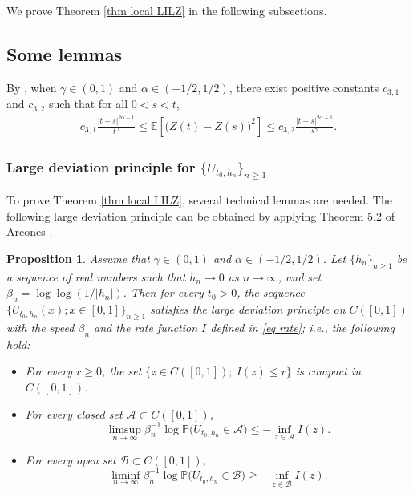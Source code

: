 \documentclass[11pt, reqno]{amsart}
\numberwithin{equation}{section}
\newtheorem{proposition}{Proposition}[section]
\newcommand{\1}{{\bf 1}}
\newcommand{\2}{{\bf 2}}
\begin{document}
 We prove Theorem \ref{thm local LILZ}   in the following subsections.

\subsection{Some lemmas}
 By \cite[Lemma  3.1]{WX2021a},   {when $\gamma\in (0,1)$ and  $\alpha\in (-1/2, 1/2)$,}
there exist positive constants $c_{3, 1}$ and  $c_{3,2}$ such that   for all $0 < s < t$,
 \begin{align}\label{Eq: Zmoment1}
c_{3,1}\frac{|t-s|^{2\alpha+1}}{t^{ \gamma}}\le     \mathbb E\left[\big(Z(t)-Z(s) \big)^2\right]
\le c_{3,2}\frac{|t-s|^{2\alpha+1}}{s^{ \gamma}}.
 \end{align} 

 \subsubsection{Large deviation principle for $\{U_{t_0, h_n}\}_{n\ge1}$}

   To prove Theorem \ref{thm local LILZ},  several technical lemmas are needed.  The following large deviation
   principle can be obtained by applying Theorem 5.2 of Arcones \cite{Arc}.

   \begin{proposition}\label{prop LDP} Assume that  {$\gamma\in (0, 1)$ and $\alpha\in (-1/2,1/2)$}.  
   Let $\{h_n\}_{n\ge1}$ be a sequence of  real numbers  {such that $h_n\rightarrow0 $  as $n\rightarrow \infty$}, and set $\beta_n=  {\log\log} (1/|h_n|)$. Then  for every   $t_0>0$, the sequence $\{U_{t_0, h_n}(x); x\in [0,1]\}_{n\ge1}$ satisfies  the large deviation principle on $C([0,1])$ with the speed $\beta_n$ and  the rate function $I$ defined  in \eqref{eq rate}; i.e.,   the following   hold:
    \begin{itemize}
    \item[(i).] For every $r\ge 0$, the set $\{z\in C([0,1]); \ I(z)\le r\}$ is compact in $C([0,1])$.

    \item[(ii).] For every closed set $\mathscr A\subset C([0,1])$,
    \begin{equation}\label{eq ULD}
    \limsup_{n\rightarrow\infty} \beta_n^{-1}\log \mathbb P\big(U_{t_0, h_n}\in \mathscr A \big)\le -\inf_{z\in \mathscr A}I(z).
    \end{equation}

    \item[(iii).] For every open set $\mathscr B\subset C([0,1])$,
    \begin{equation}\label{eq LLD}
    \liminf_{n\rightarrow\infty} \beta_n^{-1}\log \mathbb P\big(U_{t_0, h_n}\in \mathscr B \big)\ge -\inf_{z\in \mathscr B}I(z).
    \end{equation}
    \end{itemize}
   \end{proposition}
\end{document}
